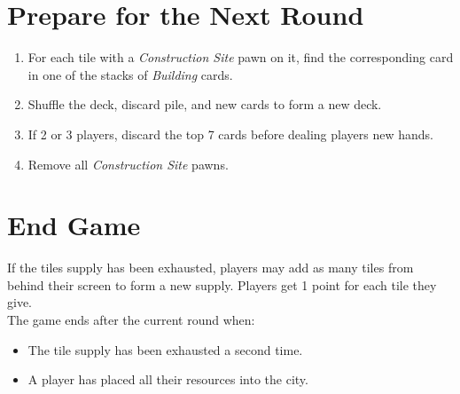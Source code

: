 \documentclass[10pt]{article}
\newenvironment{enumerateCustom}
{\begin{enumerate}
  \setlength{\itemsep}{1pt}
  \setlength{\parskip}{0pt}
  \setlength{\parsep}{0pt}}
{\end{enumerate}}
\newenvironment{itemizeCustom}
{\begin{itemize}
  \setlength{\itemsep}{1pt}
  \setlength{\parskip}{0pt}
  \setlength{\parsep}{0pt}}
{\end{itemize}}
\begin{document}
\begin{multicols*}{2}
\section*{Prepare for the Next Round}
\begin{enumerateCustom}
	\item For each tile with a \emph{Construction Site} pawn on it, find the corresponding card in one of the stacks of \emph{Building} cards.
	\item Shuffle the deck, discard pile, and new cards to form a new deck.
	\item If 2 or 3 players, discard the top 7 cards before dealing players new hands.
	\item Remove all \emph{Construction Site} pawns.
\end{enumerateCustom}

\section*{End Game}
If the tiles supply has been exhausted, players may add as many tiles from behind their screen to form a new supply. Players get 1 point for each tile they give.\\
The game ends after the current round when:
\begin{itemizeCustom}
	\item The tile supply has been exhausted a second time.
	\item A player has placed all their resources into the city.
\end{itemizeCustom}

\end{multicols*}
\end{document}
